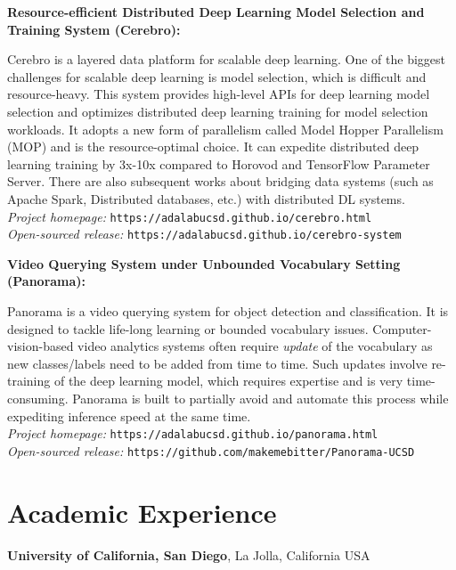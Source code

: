 \documentclass[margin,line]{res}
\begin{document}
\begin{resume}
{\bf Resource-efficient Distributed Deep Learning Model Selection and Training System (Cerebro):}

Cerebro is a layered data platform for scalable deep learning. One of the biggest challenges for scalable deep learning is model selection, which is difficult and resource-heavy. This system provides high-level APIs for deep learning model selection and optimizes distributed deep learning training for model selection workloads. It adopts a new form of parallelism called Model Hopper Parallelism (MOP) and is the resource-optimal choice. It can expedite distributed deep learning training by 3x-10x compared to Horovod and TensorFlow Parameter Server. There are also subsequent works about bridging data systems (such as Apache Spark, Distributed databases, etc.) with distributed DL systems.\\
\textit{Project homepage: }\texttt{https://adalabucsd.github.io/cerebro.html}\\
\textit{Open-sourced release: }\texttt{https://adalabucsd.github.io/cerebro-system}

{\bf Video Querying System under Unbounded Vocabulary Setting (Panorama):}

Panorama is a video querying system for object detection and classification. It is designed to tackle life-long learning or bounded vocabulary issues. Computer-vision-based video analytics systems often require \textit{update} of the vocabulary as new classes/labels need to be added from time to time. Such updates involve re-training of the deep learning model, which requires expertise and is very time-consuming. Panorama is built to partially avoid and automate this process while expediting inference speed at the same time.\\
\textit{Project homepage: }\texttt{https://adalabucsd.github.io/panorama.html}\\
\textit{Open-sourced release: }\texttt{https://github.com/makemebitter/Panorama-UCSD}


\section{\sc Academic Experience}
{\bf University of California, San Diego}, La Jolla, California USA


\end{resume}
\end{document}
